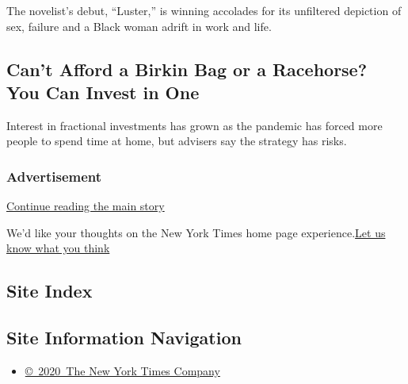 The novelist's debut, ``Luster,'' is winning accolades for its
unfiltered depiction of sex, failure and a Black woman adrift in work
and life.

\href{/2020/07/31/books/raven-leilani-luster.html}{}

\href{/2020/07/31/your-money/birkin-bag-racehorse-invest.html}{}

\hypertarget{cant-afford-a-birkin-bag-or-a-racehorse-you-can-invest-in-one}{%
\subsection{Can't Afford a Birkin Bag or a Racehorse? You Can Invest in
One}\label{cant-afford-a-birkin-bag-or-a-racehorse-you-can-invest-in-one}}

Interest in fractional investments has grown as the pandemic has forced
more people to spend time at home, but advisers say the strategy has
risks.

\href{/2020/07/31/your-money/birkin-bag-racehorse-invest.html}{}

\hypertarget{advertisement}{%
\subsubsection{Advertisement}\label{advertisement}}

\protect\hyperlink{after-dfp-ad-mid1-large}{Continue reading the main
story}

We'd like your thoughts on the New York Times home page
experience.\href{http://nyt.qualtrics.com/jfe/form/SV_eFJmKj9v0krSE0l}{Let
us know what you think}

\hypertarget{site-index}{%
\subsection{Site Index}\label{site-index}}

\hypertarget{site-information-navigation}{%
\subsection{Site Information
Navigation}\label{site-information-navigation}}

\begin{itemize}
\tightlist
\item
  \href{https://help.nytimes3xbfgragh.onion/hc/en-us/articles/115014792127-Copyright-notice}{©~2020~The
  New York Times Company}
\end{itemize}

